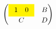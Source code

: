 \documentclass{article}
\begin{document}
\[ \begin{pmatrix}
\colorbox{yellow}{$\begin{array}{cc}1 &0\end{array}$} & B\\ C & D
\end{pmatrix} \]
\end{document}
